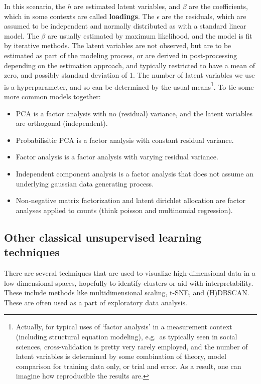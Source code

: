 \documentclass[
  letterpaper,
]{krantz}
\providecommand{\tightlist}{%
  \setlength{\itemsep}{0pt}\setlength{\parskip}{0pt}}\usepackage{longtable,booktabs,array}
\begin{document}
In this scenario, the \(h\) are estimated latent variables, and
\(\beta\) are the coefficients, which in some contexts are called
\textbf{loadings}. The \(\epsilon\) are the residuals, which are assumed
to be independent and normally distributed as with a standard linear
model. The \(\beta\) are usually estimated by maximum likelihood, and
the model is fit by iterative methods. The latent variables are not
observed, but are to be estimated as part of the modeling process, or
are derived in post-processing depending on the estimation approach, and
typically restricted to have a mean of zero, and possibly standard
deviation of 1. The number of latent variables we use is a
hyperparameter, and so can be determined by the usual means\footnote{Actually,
  for typical uses of `factor analysis' in a measurement context
  (including structural equation modeling), e.g.~as typically seen in
  social sciences, cross-validation is pretty very rarely employed, and
  the number of latent variables is determined by some combination of
  theory, model comparison for training data only, or trial and error.
  As a result, one can imagine how reproducible the results are.}. To
tie some more common models together:

\begin{itemize}
\tightlist
\item
  PCA is a factor analysis with no (residual) variance, and the latent
  variables are orthogonal (independent).
\item
  Probabilisitic PCA is a factor analysis with constant residual
  variance.
\item
  Factor analysis is a factor analysis with varying residual variance.
\item
  Independent component analysis is a factor analysis that does not
  assume an underlying gaussian data generating process.
\item
  Non-negative matrix factorization and latent dirichlet allocation are
  factor analyses applied to counts (think poisson and multinomial
  regression).
\end{itemize}

\subsection{Other classical unsupervised learning
techniques}\label{other-classical-unsupervised-learning-techniques}

There are several techniques that are used to visualize high-dimensional
data in a low-dimensional spaces, hopefully to identify clusters or aid
with interpretability. These include methods like multidimensional
scaling, t-SNE, and (H)DBSCAN. These are often used as a part of
exploratory data analysis.
\end{document}
